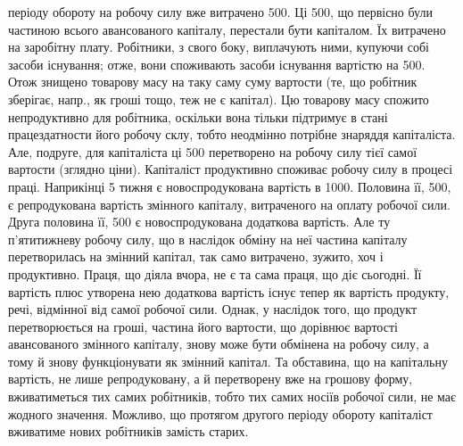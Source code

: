 \parcont{}  %
періоду обороту на робочу силу вже витрачено 500. Ці 500,
що первісно були частиною всього авансованого капіталу, перестали бути
капіталом. Їх витрачено на заробітну плату. Робітники, з свого боку,
виплачують ними, купуючи собі засоби існування; отже, вони споживають
засоби існування вартістю на 500. Отож знищено товарову
масу на таку саму суму вартости (те, що робітник зберігає, напр., як
гроші тощо, теж не є капітал). Цю товарову масу спожито непродуктивно
для робітника, оскільки вона тільки підтримує в стані працездатности
його робочу склу, тобто неодмінно потрібне знаряддя капіталіста. Але,
подруге, для капіталіста ці 500 перетворено на робочу силу тієї
самої вартости (зглядно ціни). Капіталіст продуктивно споживає робочу
силу в процесі праці. Наприкінці 5 тижня є новоспродукована вартість
в 1000. Половина її, 500, є репродукована вартість змінного
капіталу, витраченого на оплату робочої сили. Друга половина її,
500 є новоспродукована додаткова вартість. Але ту п’ятитижневу
робочу силу, що в наслідок обміну на неї частина капіталу перетворилась
на змінний капітал, так само витрачено, зужито, хоч і продуктивно.
Праця, що діяла вчора, не є та сама праця, що діє сьогодні. Її
вартість плюс утворена нею додаткова вартість існує тепер як вартість
продукту, речі, відмінної від самої робочої сили. Однак, у наслідок того,
що продукт перетворюється на гроші, частина його вартости, що дорівнює
вартості авансованого змінного капіталу, знову може бути
обмінена на робочу силу, а тому й знову функціонувати як змінний капітал.
Та обставина, що на капітальну вартість, не лише репродуковану,
а й перетворену вже на грошову форму, вживатиметься тих самих робітників,
тобто тих самих носіїв робочої сили, не має жодного значення.
Можливо, що протягом другого періоду обороту капіталіст вживатиме
нових робітників замість старих.

